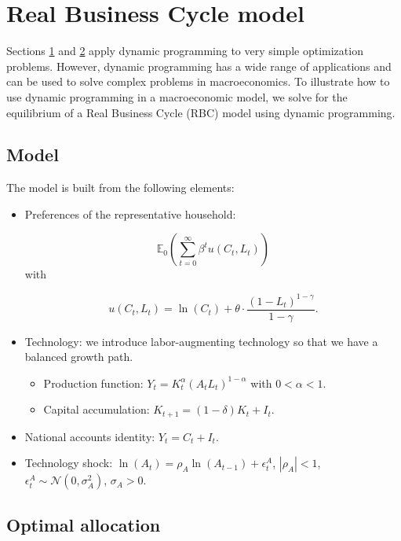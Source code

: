 \documentclass{article}
\begin{document}
\setcounter{section}{2}
\section{Real Business Cycle model}

Sections \href{deterministic.tex#ref-sec-deterministic}{1} and \href{stochastic.tex#ref-sec-stochastic}{2} apply dynamic programming to very simple optimization problems. However, dynamic programming has a wide range of applications and can be used to solve complex problems in macroeconomics. To illustrate how to use dynamic programming in a macroeconomic model, we solve for the equilibrium of a Real Business Cycle (RBC) model using dynamic programming.

\subsection{Model}

The model is built from the following elements:
\begin{itemize}
\item Preferences of the representative household: 

\[
\mathbb{E}_{0}\left(\sum_{t=0}^{\infty}\beta^t u(C_{t},L_{t})\right)
\]
with 

\[
u(C_{t},L_{t}) =\ln\left(C_{t}\right) +\theta \cdot \frac{(1-L_{t})^{1-\gamma}}{1-\gamma}.
\]
\item Technology: we introduce labor-augmenting technology so that we have a balanced growth path.
\begin{itemize}
\item Production function: $Y_{t}=K_{t}^{\alpha} \left(A_{t} L_{t}\right)^{1-\alpha}$ with $0<\alpha<1$.
\item Capital accumulation: $K_{t+1}= (1-\delta) K_{t}+I_{t}$.
\end{itemize}
\item National accounts identity: $Y_{t} =C_{t}+I_{t}$.
\item Technology shock: $\ln\left(A_{t}\right) =\rho_{A} \ln\left(A_{t-1}\right) +\epsilon^{A}_{t}$, $\left\lvert \rho_{A}\right\rvert<1$, $\epsilon^{A}_{t}\sim \mathcal{N}\left(0,\sigma_{A}^{2}\right)$, $\sigma_{A}>0$.
\end{itemize}

\subsection{Optimal allocation}
\end{document}
